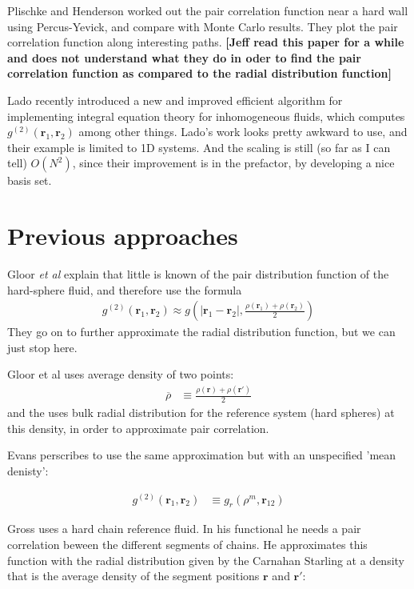 \documentclass[letterpaper,twocolumn,amsmath,amssymb,pre]{revtex4-1}
\newcommand{\red}[1]{{\bf \color{red} #1}}
\newcommand{\rr}{\textbf{r}}
\newcommand{\fixme}[1]{\red{[#1]}}
\begin{document}
Plischke and Henderson worked out the pair correlation function near a
hard wall using Percus-Yevick, and compare with Monte Carlo
results\cite{plischke1986pair}.  They plot the pair correlation
function along interesting paths.  \fixme{Jeff read this paper for a
  while and does not understand what they do in oder to find the pair
  correlation function as compared to the radial distribution function}

Lado recently introduced a new and improved efficient algorithm for
implementing integral equation theory for inhomogeneous fluids, which
computes $g^{(2)}(\rr_1,\rr_2)$ among other
things\cite{lado2009efficient}.  Lado's work looks pretty awkward to
use, and their example is limited to 1D systems.  And the scaling is
still (so far as I can tell) $O(N^2)$, since their improvement is in
the prefactor, by developing a nice basis set.

\section{Previous approaches}

Gloor \emph{et al} explain that little is known of the pair
distribution function of the hard-sphere fluid, and therefore use the
formula
\begin{align}
  g^{(2)}(\rr_1,\rr_2) \approx g\left(|\rr_1-\rr_2|, \frac{\rho(\rr_1)+\rho(\rr_2)}2\right)
\end{align}
They go on to further approximate the radial distribution function,
but we can just stop here.

Gloor et al \cite{gloor2007prediction} uses average density of two points:
\begin{align}
\overline{\rho} &\equiv \frac{\rho(\rr)+\rho(\rr')}{2}
\end{align}
and the uses bulk radial distribution for the reference system (hard
spheres) at this density, in order to approximate pair correlation.

Evans \cite{evans1992density}perscribes to use the same approximation but with an unspecified 'mean denisty':

\begin{align}
g^{(2)}(\rr_1,\rr_2) &\equiv g_r(\rho^m,\rr_{12})
\end{align}

Gross \cite{gross2009density} uses a hard chain reference fluid.  In
his functional he needs a pair correlation beween the different
segments of chains.  He approximates this function with the radial
distribution given by the Carnahan Starling at a density that is the
average density of the segment positions $\rr$ and $\rr'$:
\end{document}
